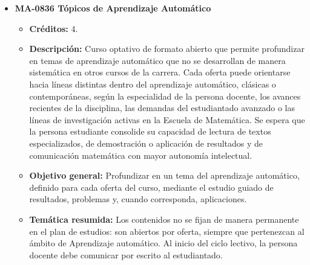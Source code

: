 \begin{itemize}[leftmargin=1.3em, itemsep=10pt, topsep=4pt, label={\color{Azul-UCR}$\blacksquare$}]
\item {\color{Azul-UCR}\textbf{MA-0836 Tópicos de Aprendizaje Automático}}\par\nopagebreak\smallskip
\begin{itemize}[leftmargin=1.1em, itemsep=3pt, topsep=2pt, parsep=2pt, label={\textendash}]
\item \textbf{Créditos:} 4.
\item \textbf{Descripción:} Curso optativo de formato abierto que permite profundizar en temas de aprendizaje automático que no se desarrollan de manera sistemática en otros cursos de la carrera. Cada oferta puede orientarse hacia líneas distintas dentro del aprendizaje automático, clásicas o contemporáneas, según la especialidad de la persona docente, los avances recientes de la disciplina, las demandas del estudiantado avanzado o las líneas de investigación activas en la Escuela de Matemática. Se espera que la persona estudiante consolide su capacidad de lectura de textos especializados, de demostración o aplicación de resultados y de comunicación matemática con mayor autonomía intelectual.
\item \textbf{Objetivo general:} Profundizar en un tema del aprendizaje automático, definido para cada oferta del curso, mediante el estudio guiado de resultados, problemas y, cuando corresponda, aplicaciones.
\item \textbf{Temática resumida:} Los contenidos no se fijan de manera permanente en el plan de estudios: son abiertos por oferta, siempre que pertenezcan al ámbito de Aprendizaje automático. Al inicio del ciclo lectivo, la persona docente debe comunicar por escrito al estudiantado.
\end{itemize}


\end{itemize}
